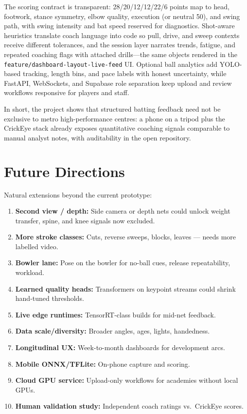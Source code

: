 \begin{justify}
The scoring contract is transparent: 28/20/12/12/22/6 points map to head, footwork, stance symmetry, elbow quality, execution (or neutral 50), and swing path, with swing intensity and bat speed reserved for diagnostics. Shot-aware heuristics translate coach language into code so pull, drive, and sweep contexts receive different tolerances, and the session layer narrates trends, fatigue, and repeated coaching flags with attached drills---the same objects rendered in the \texttt{feature/dashboard-layout-live-feed} UI. Optional ball analytics add YOLO-based tracking, length bins, and pace labels with honest uncertainty, while FastAPI, WebSockets, and Supabase role separation keep upload and review workflows responsive for players and staff.

In short, the project shows that structured batting feedback need not be exclusive to metro high-performance centres: a phone on a tripod plus the CrickEye stack already exposes quantitative coaching signals comparable to manual analyst notes, with auditability in the open repository.

\section{Future Directions}

\par Natural extensions beyond the current prototype:

\begin{enumerate}
    \item \textbf{Second view / depth:} Side camera or depth nets could unlock weight transfer, spine, and knee signals now excluded.
    \item \textbf{More stroke classes:} Cuts, reverse sweeps, blocks, leaves --- needs more labelled video.
    \item \textbf{Bowler lane:} Pose on the bowler for no-ball cues, release repeatability, workload.
    \item \textbf{Learned quality heads:} Transformers on keypoint streams could shrink hand-tuned thresholds.
    \item \textbf{Live edge runtimes:} TensorRT-class builds for mid-net feedback.
    \item \textbf{Data scale/diversity:} Broader angles, ages, lights, handedness.
    \item \textbf{Longitudinal UX:} Week-to-month dashboards for development arcs.
    \item \textbf{Mobile ONNX/TFLite:} On-phone capture and scoring.
    \item \textbf{Cloud GPU service:} Upload-only workflows for academies without local GPUs.
    \item \textbf{Human validation study:} Independent coach ratings vs.\ CrickEye scores.
\end{enumerate}

\end{justify}
